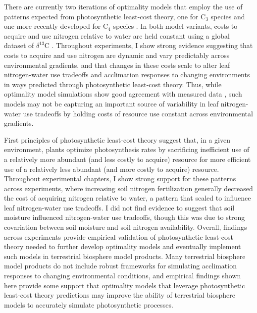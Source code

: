 There are currently two iterations of optimality models that employ the use of patterns expected from photosynthetic least-cost theory, one for C$_3$ species  and one more recently developed for C$_4$ species . In both model variants, costs to acquire and use nitrogen relative to water are held constant using a global dataset of $\delta^{13}$C . Throughout experiments, I show strong evidence suggesting that costs to acquire and use nitrogen are dynamic and vary predictably across environmental gradients, and that changes in these costs scale to alter leaf nitrogen-water use tradeoffs and acclimation responses to changing environments in ways predicted through photosynthetic least-cost theory. Thus, while optimality model simulations show good agreement with measured data , such models may not be capturing an important source of variability in leaf nitrogen-water use tradeoffs by holding costs of resource use constant across environmental gradients.

First principles of photosynthetic least-cost theory suggest that, in a given environment, plants optimize photosynthesis rates by sacrificing inefficient use of a relatively more abundant (and less costly to acquire) resource for more efficient use of a relatively less abundant (and more costly to acquire) resource. Throughout experimental chapters, I show strong support for these patterns across experiments, where increasing soil nitrogen fertilization generally decreased the cost of acquiring nitrogen relative to water, a pattern that scaled to influence leaf nitrogen-water use tradeoffs. I did not find evidence to suggest that soil moisture influenced nitrogen-water use tradeoffs, though this was due to strong covariation between soil moisture and soil nitrogen availability. Overall, findings across experiments provide empirical validation of photosynthetic least-cost theory needed to further develop optimality models and eventually implement such models in terrestrial biosphere model products. Many terrestrial biosphere model products do not include robust frameworks for simulating acclimation responses to changing environmental conditions, and empirical findings shown here provide some support that optimality models that leverage photosynthetic least-cost theory predictions may improve the ability of terrestrial biosphere models to accurately simulate photosynthetic processes.


